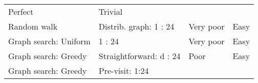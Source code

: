 \documentclass[10pt,oneside]{memoir}
\begin{document}
\begin{longtable}[]{@{}llll@{}}
\begin{minipage}[t]{0.13\columnwidth}
Perfect\strut
\end{minipage} & \begin{minipage}[t]{0.13\columnwidth}\raggedright
Trivial\strut
\end{minipage}\tabularnewline
\begin{minipage}[t]{0.28\columnwidth}\raggedright
Random walk\strut
\end{minipage} & \begin{minipage}[t]{0.35\columnwidth}\raggedright
Distrib. graph: 1 : 24\strut
\end{minipage} & \begin{minipage}[t]{0.13\columnwidth}\raggedright
Very poor\strut
\end{minipage} & \begin{minipage}[t]{0.13\columnwidth}\raggedright
Easy\strut
\end{minipage}\tabularnewline
\begin{minipage}[t]{0.28\columnwidth}\raggedright
Graph search: Uniform\strut
\end{minipage} & \begin{minipage}[t]{0.35\columnwidth}\raggedright
1 : 24\strut
\end{minipage} & \begin{minipage}[t]{0.13\columnwidth}\raggedright
Very poor\strut
\end{minipage} & \begin{minipage}[t]{0.13\columnwidth}\raggedright
Easy\strut
\end{minipage}\tabularnewline
\begin{minipage}[t]{0.28\columnwidth}\raggedright
Graph search: Greedy\strut
\end{minipage} & \begin{minipage}[t]{0.35\columnwidth}\raggedright
Straightforward: d : 24\strut
\end{minipage} & \begin{minipage}[t]{0.13\columnwidth}\raggedright
Poor\strut
\end{minipage} & \begin{minipage}[t]{0.13\columnwidth}\raggedright
Easy\strut
\end{minipage}\tabularnewline
\begin{minipage}[t]{0.28\columnwidth}\raggedright
Graph search: Greedy\strut
\end{minipage} & \begin{minipage}[t]{0.35\columnwidth}\raggedright
Pre-visit: 1:24\strut
\end{minipage} & \begin{minipage}[t]{0.13\columnwidth}\raggedright

\end{minipage}
\end{longtable}
\end{document}
